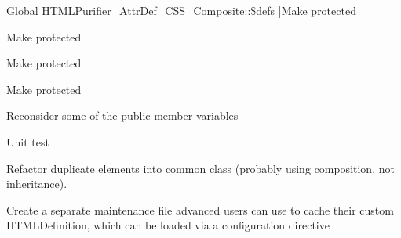 \begin{DoxyRefList}
Global \hyperlink{class_h_t_m_l_purifier___attr_def___c_s_s___composite_aa6ec534ac1cd16842d8459d8b52776aa}{H\-T\-M\-L\-Purifier\-\_\-\-Attr\-Def\-\_\-\-C\-S\-S\-\_\-\-Composite\-:\-:\$defs} ]Make protected  
\item[\label{todo__todo000032}%
\hypertarget{todo__todo000032}{}%
Global \hyperlink{class_h_t_m_l_purifier___attr_def___c_s_s___multiple_a9fb747ef5633c244639185a7fe54f6b0}{H\-T\-M\-L\-Purifier\-\_\-\-Attr\-Def\-\_\-\-C\-S\-S\-\_\-\-Multiple\-:\-:\$max} ]Make protected  
\item[\label{todo__todo000031}%
\hypertarget{todo__todo000031}{}%
Global \hyperlink{class_h_t_m_l_purifier___attr_def___c_s_s___multiple_a6b7e9a3172869a1e852851d011b25f01}{H\-T\-M\-L\-Purifier\-\_\-\-Attr\-Def\-\_\-\-C\-S\-S\-\_\-\-Multiple\-:\-:\$single} ]Make protected  
\item[\label{todo__todo000033}%
\hypertarget{todo__todo000033}{}%
Global \hyperlink{class_h_t_m_l_purifier___attr_def___enum_a1d44a5c819db007521315ce098bd45ed}{H\-T\-M\-L\-Purifier\-\_\-\-Attr\-Def\-\_\-\-Enum\-:\-:\$valid\-\_\-values} ]Make protected  
\item[\label{todo__todo000034}%
\hypertarget{todo__todo000034}{}%
Class \hyperlink{class_h_t_m_l_purifier___config}{H\-T\-M\-L\-Purifier\-\_\-\-Config} ]Reconsider some of the public member variables  
\item[\label{todo__todo000035}%
\hypertarget{todo__todo000035}{}%
Class \hyperlink{class_h_t_m_l_purifier___content_sets}{H\-T\-M\-L\-Purifier\-\_\-\-Content\-Sets} ]Unit test  
\item[\label{todo__todo000036}%
\hypertarget{todo__todo000036}{}%
Global \hyperlink{class_h_t_m_l_purifier___c_s_s_definition_a9f68b1551a00502a63c0addacc0a0f1b}{H\-T\-M\-L\-Purifier\-\_\-\-C\-S\-S\-Definition\-:\-:setup\-Config\-Stuff} (\$config)]Refactor duplicate elements into common class (probably using composition, not inheritance).  
\item[\label{todo__todo000040}%
\hypertarget{todo__todo000040}{}%
Class \hyperlink{class_h_t_m_l_purifier___definition_cache}{H\-T\-M\-L\-Purifier\-\_\-\-Definition\-Cache} ]Create a separate maintenance file advanced users can use to cache their custom H\-T\-M\-L\-Definition, which can be loaded via a configuration directive 


\end{DoxyRefList}
